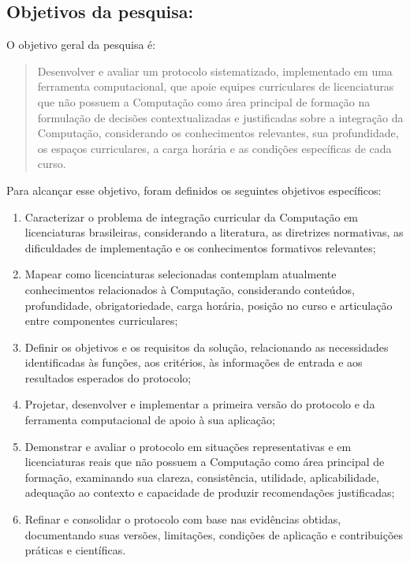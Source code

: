 \subsection*{Objetivos da pesquisa:}

O objetivo geral da pesquisa é:

\begin{quote}
Desenvolver e avaliar um protocolo sistematizado, implementado em uma ferramenta computacional, que apoie equipes curriculares de licenciaturas que não possuem a Computação como área principal de formação na formulação de decisões contextualizadas e justificadas sobre a integração da Computação, considerando os conhecimentos relevantes, sua profundidade, os espaços curriculares, a carga horária e as condições específicas de cada curso.
\end{quote}

Para alcançar esse objetivo, foram definidos os seguintes objetivos específicos:

\begin{enumerate}

\item Caracterizar o problema de integração curricular da Computação em licenciaturas brasileiras, considerando a literatura, as diretrizes normativas, as dificuldades de implementação e os conhecimentos formativos relevantes;
\item Mapear como licenciaturas selecionadas contemplam atualmente conhecimentos relacionados à Computação, considerando conteúdos, profundidade, obrigatoriedade, carga horária, posição no curso e articulação entre componentes curriculares;
\item Definir os objetivos e os requisitos da solução, relacionando as necessidades identificadas às funções, aos critérios, às informações de entrada e aos resultados esperados do protocolo;
\item Projetar, desenvolver e implementar a primeira versão do protocolo e da ferramenta computacional de apoio à sua aplicação;
\item Demonstrar e avaliar o protocolo em situações representativas e em licenciaturas reais que não possuem a Computação como área principal de formação, examinando sua clareza, consistência, utilidade, aplicabilidade, adequação ao contexto e capacidade de produzir recomendações justificadas;
\item Refinar e consolidar o protocolo com base nas evidências obtidas, documentando suas versões, limitações, condições de aplicação e contribuições práticas e científicas.
\end{enumerate}

